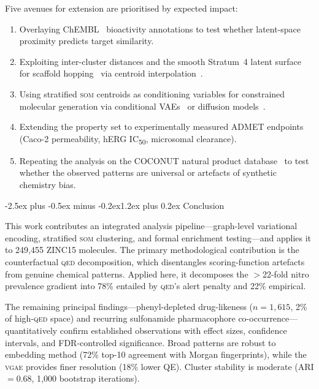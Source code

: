 \documentclass[10pt,a4paper,twocolumn]{article}
\makeatletter
\providecommand{\qed}{}
\let\qed\relax
\newcommand{\vgae}{\textsc{vgae}}
\newcommand{\som}{\textsc{som}}
\newcommand{\qedscore}{\textsc{qed}}
\let\qed\qedscore
\renewcommand\section{\@startsection{section}{1}{\z@}%
  {-2.5ex plus -0.5ex minus -0.2ex}{1.2ex plus 0.2ex}%
  {\normalfont\Large\bfseries}}
\makeatother
\begin{document}
Five avenues for extension are prioritised by expected impact:
\begin{enumerate}[label=(\roman*)]
  \item Overlaying ChEMBL~\cite{gaulton2017} bioactivity annotations to test whether latent-space proximity predicts target similarity.
  \item Exploiting inter-cluster distances and the smooth Stratum~4 latent surface for scaffold hopping~\cite{hu2017} via centroid interpolation~\cite{gomezbombarelli2018}.
  \item Using stratified \som{} centroids as conditioning variables for constrained molecular generation via conditional VAEs~\cite{sohn2015} or diffusion models~\cite{hoogeboom2022}.
  \item Extending the property set to experimentally measured ADMET endpoints (Caco-2 permeability, hERG IC\textsubscript{50}, microsomal clearance).
  \item Repeating the analysis on the COCONUT natural product database~\cite{sorokina2021} to test whether the observed patterns are universal or artefacts of synthetic chemistry bias.
\end{enumerate}

\section{Conclusion}
\label{sec:conclusion}

This work contributes an integrated analysis pipeline---graph-level variational encoding, stratified \som{} clustering, and formal enrichment testing---and applies it to 249,455 ZINC15 molecules. The primary methodological contribution is the counterfactual \qed{} decomposition, which disentangles scoring-function artefacts from genuine chemical patterns. Applied here, it decomposes the $>$22-fold nitro prevalence gradient into 78\% entailed by \qed{}'s alert penalty and 22\% empirical.

The remaining principal findings---phenyl-depleted drug-likeness ($n = 1{,}615$, 2\% of high-\qed{} space) and recurring sulfonamide pharmacophore co-occurrence---quantitatively confirm established observations with effect sizes, confidence intervals, and FDR-controlled significance. Broad patterns are robust to embedding method (72\% top-10 agreement with Morgan fingerprints), while the \vgae{} provides finer resolution (18\% lower QE). Cluster stability is moderate (ARI $= 0.68$, 1{,}000 bootstrap iterations).
\end{document}
